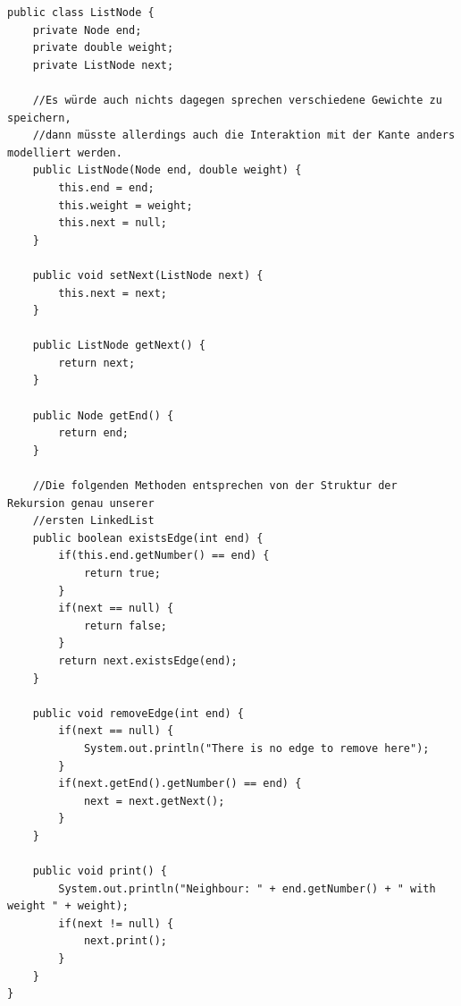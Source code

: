 \documentclass{article}
\begin{document}
\begin{verbatim}
public class ListNode {
    private Node end;
    private double weight; 
    private ListNode next;

    //Es würde auch nichts dagegen sprechen verschiedene Gewichte zu speichern, 
    //dann müsste allerdings auch die Interaktion mit der Kante anders modelliert werden.
    public ListNode(Node end, double weight) {
        this.end = end;
        this.weight = weight;
        this.next = null;
    }

    public void setNext(ListNode next) {
        this.next = next;
    }

    public ListNode getNext() {
        return next;
    }

    public Node getEnd() {
        return end;
    }

    //Die folgenden Methoden entsprechen von der Struktur der Rekursion genau unserer 
    //ersten LinkedList
    public boolean existsEdge(int end) {
        if(this.end.getNumber() == end) {
            return true;
        } 
        if(next == null) {
            return false;
        }
        return next.existsEdge(end);
    }

    public void removeEdge(int end) {
        if(next == null) {
            System.out.println("There is no edge to remove here");
        }
        if(next.getEnd().getNumber() == end) {
            next = next.getNext();
        }
    }

    public void print() {
        System.out.println("Neighbour: " + end.getNumber() + " with weight " + weight);
        if(next != null) {
            next.print();
        }
    }
}
\end{verbatim}
\end{document}
